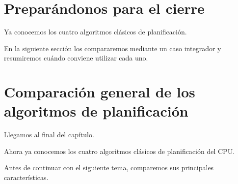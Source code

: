 \documentclass[
  spanish,
  letterpaper,
]{scrbook}
\begin{document}

\chapter{Preparándonos para el
cierre}\label{preparuxe1ndonos-para-el-cierre}

Ya conocemos los cuatro algoritmos clásicos de planificación.

En la siguiente sección los compararemos mediante un caso integrador y
resumiremos cuándo conviene utilizar cada uno.


\chapter{Comparación general de los algoritmos de
planificación}\label{comparaciuxf3n-general-de-los-algoritmos-de-planificaciuxf3n}

Llegamos al final del capítulo.

Ahora ya conocemos los cuatro algoritmos clásicos de planificación del
CPU.

Antes de continuar con el siguiente tema, comparemos sus principales
características.
\end{document}
